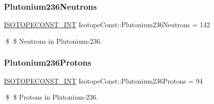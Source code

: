 \subsubsection{\texorpdfstring{Plutonium236\+Neutrons}{Plutonium236Neutrons}}
{\footnotesize\ttfamily \mbox{\hyperlink{group___isotope_const-_macros_ga5f18360b3e99483a35c32d789e62621c}{I\+S\+O\+T\+O\+P\+E\+C\+O\+N\+S\+T\+\_\+\+I\+NT}} Isotope\+Const\+::\+Plutonium236\+Neutrons = 142}

\$ \$ Neutrons in Plutonium-\/236. \mbox{\label{group___isotope_const-_plutonium-_pu236_gac6a2761b1cf0f4e2f2013ecf803e23dc}} 
\subsubsection{\texorpdfstring{Plutonium236\+Protons}{Plutonium236Protons}}
{\footnotesize\ttfamily \mbox{\hyperlink{group___isotope_const-_macros_ga5f18360b3e99483a35c32d789e62621c}{I\+S\+O\+T\+O\+P\+E\+C\+O\+N\+S\+T\+\_\+\+I\+NT}} Isotope\+Const\+::\+Plutonium236\+Protons = 94}

\$ \$ Protons in Plutonium-\/236. 